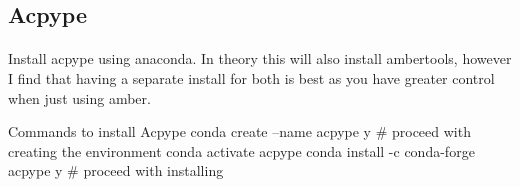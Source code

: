 \subsection{Acpype}
    \paragraph{}
    Install acpype using anaconda. In theory this will also install ambertools, however I find that having a separate install for both is best as you have greater control when just using amber.
    \begin{bashcmd}[label=listing:ACPYPEINST]{Commands to install Acpype}
    conda create --name acpype
        y   # proceed with creating the environment
    conda activate acpype
    conda install -c conda-forge acpype
        y   # proceed with installing
    \end{bashcmd}

